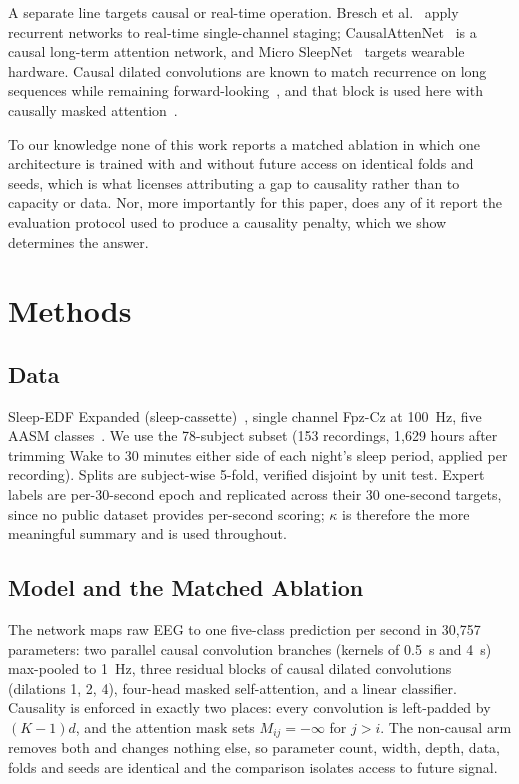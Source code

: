 \documentclass[conference]{IEEEtran}
\begin{document}
A separate line targets causal or real-time operation. Bresch et al.~\cite{bresch} apply recurrent
networks to real-time single-channel staging; CausalAttenNet~\cite{causalattennet} is a causal
long-term attention network, and Micro SleepNet~\cite{microsleepnet} targets wearable hardware.
Causal dilated convolutions are known to match recurrence on long sequences while remaining
forward-looking~\cite{tcn}, and that block is used here with causally masked
attention~\cite{attention}.

To our knowledge none of this work reports a matched ablation in which one architecture is trained
with and without future access on identical folds and seeds, which is what licenses attributing a
gap to causality rather than to capacity or data. Nor, more importantly for this paper, does any of
it report the evaluation protocol used to produce a causality penalty, which we show determines the
answer.

\section{Methods}

\subsection{Data}

Sleep-EDF Expanded (sleep-cassette)~\cite{physionet, kemp}, single channel Fpz-Cz at 100~Hz, five
AASM classes~\cite{aasm}. We use the 78-subject subset (153 recordings, 1{,}629 hours after
trimming Wake to 30 minutes either side of each night's sleep period, applied per recording).
Splits are subject-wise 5-fold, verified disjoint by unit test. Expert labels are per-30-second
epoch and replicated across their 30 one-second targets, since no public dataset provides
per-second scoring; $\kappa$ is therefore the more meaningful summary and is used throughout.

\subsection{Model and the Matched Ablation}

The network maps raw EEG to one five-class prediction per second in 30{,}757 parameters: two
parallel causal convolution branches (kernels of 0.5~s and 4~s) max-pooled to 1~Hz, three residual
blocks of causal dilated convolutions (dilations 1, 2, 4), four-head masked self-attention, and a
linear classifier. Causality is enforced in exactly two places: every convolution is left-padded by
$(K-1)d$, and the attention mask sets $M_{ij} = -\infty$ for $j > i$. The non-causal arm removes
both and changes nothing else, so parameter count, width, depth, data, folds and seeds are
identical and the comparison isolates access to future signal.
\end{document}
